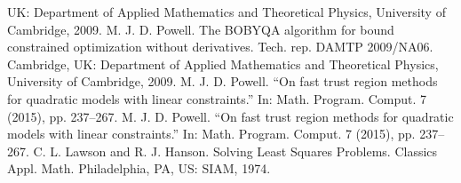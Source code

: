 \documentclass[letterpaper,10pt,english]{sphinxmanual}
\begin{document}
\begin{sphinxthebibliography}{1}
UK: Department of Applied Mathematics and Theoretical Physics, University
of Cambridge, 2009.
\sphinxAtStartPar
M. J. D. Powell. The BOBYQA algorithm for bound constrained
optimization without derivatives. Tech. rep. DAMTP 2009/NA06. Cambridge,
UK: Department of Applied Mathematics and Theoretical Physics, University
of Cambridge, 2009.
\sphinxAtStartPar
M. J. D. Powell. “On fast trust region methods for quadratic models
with linear constraints.” In: Math. Program. Comput. 7 (2015), pp.
237–\sphinxhyphen{}267.
\sphinxAtStartPar
M. J. D. Powell. “On fast trust region methods for quadratic models
with linear constraints.” In: Math. Program. Comput. 7 (2015), pp.
237–267.
\sphinxAtStartPar
C. L. Lawson and R. J. Hanson. Solving Least Squares Problems.
Classics Appl. Math. Philadelphia, PA, US: SIAM, 1974.
\end{sphinxthebibliography}


\renewcommand{\indexname}{Python Module Index}
\begin{sphinxtheindex}
\let\bigletter\sphinxstyleindexlettergroup
\bigletter{c}
\item\relax{}
\item\relax{}
\item\relax{}
\end{sphinxtheindex}

\renewcommand{\indexname}{Index}
\printindex
\end{document}
